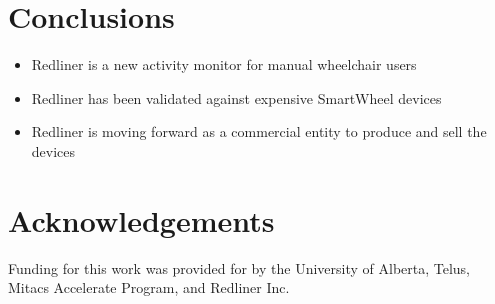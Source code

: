 \documentclass[a0,landscape]{a0poster}
\begin{document}
\begin{multicols*}{3}
\section*{Conclusions}
\begin{itemize}
    \item Redliner is a new activity monitor for manual wheelchair users
    \item Redliner has been validated against expensive SmartWheel devices
    \item Redliner is moving forward as a commercial entity to produce and sell the devices
\end{itemize}

\small
\nocite{*}



\section*{Acknowledgements}
Funding for this work was provided for by the University of Alberta, Telus, Mitacs Accelerate Program, and Redliner Inc.

\end{multicols*}
\end{document}

